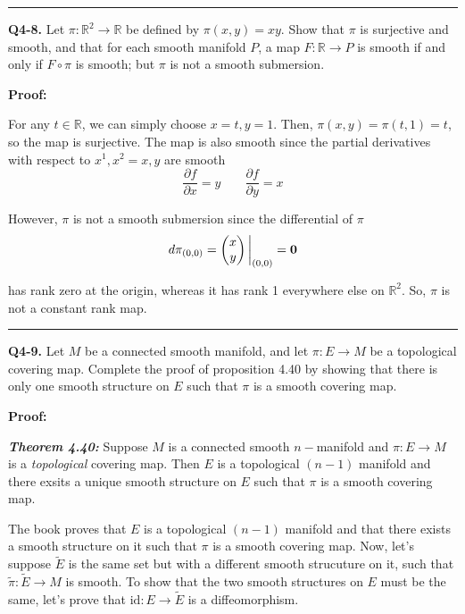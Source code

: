 \documentclass{article}
\newcommand{\R}{\mathbb{R}}
\newcommand{\restr}[2]{{%
  \left.\kern-\nulldelimiterspace %
  #1 %
  \vphantom{\big|} %
  \right|_{#2} %
  }}
\begin{document}
\vskip 0.5cm
\hrule 
\vskip 0.5cm


\textbf{Q4-8.} Let $\pi : \R^2 \rightarrow \R$ be defined by $\pi(x, y) = xy$. Show that $\pi$ is surjective and smooth, and that for each smooth manifold $P$, a map $F : \R \rightarrow P$ is smooth if and only if $F \circ \pi$ is smooth; but $\pi$ is not a smooth submersion.

\vskip 0.5cm
\textbf{Proof:}


For any $t \in \R$, we can simply choose $x = t, y = 1$. Then, $\pi(x, y) = \pi(t, 1) = t$, so the map is surjective. The map is also smooth since the partial derivatives with respect to $x^1, x^2 = x, y$ are smooth 
\[ \frac{\partial f}{\partial x} = y \;\;\;\;\;\;\; \frac{\partial f}{\partial y} = x \] 

However, $\pi$ is not a smooth submersion since the differential of $\pi$ 
\[ d\pi_{(0,0)} = \restr{\begin{pmatrix}
  x \\
  y
\end{pmatrix}}{(0,0)} = \mathbf{0} \]

has rank zero at the origin, whereas it has rank 1 everywhere else on $\R^2$. So, $\pi$ is not a constant rank map.

\vskip 0.5cm
\hrule 
\vskip 0.5cm




\textbf{Q4-9.} Let $M$ be a connected smooth manifold, and let $\pi : E \rightarrow M$ be a topological covering map. Complete the proof of proposition 4.40 by showing that there is only one smooth structure on $E$ such that $\pi$ is a smooth covering map.  

\vskip 0.5cm
\textbf{Proof:}

\begin{dottedbox}
  \emph{\textbf{Theorem 4.40:}} Suppose $M$ is a connected smooth $n-$manifold and $\pi : E \rightarrow M$ is a \emph{topological} covering map. Then $E$ is a topological $(n-1)$ manifold and there exsits a unique smooth structure on $E$ such that $\pi$ is a smooth covering map.
\end{dottedbox}

\vskip 0.5cm
The book proves that $E$ is a topological $(n-1)$ manifold and that there exists a smooth structure on it such that $\pi$ is a smooth covering map. Now, let's suppose $\tilde{E}$ is the same set but with a different smooth strucuture on it, such that $\tilde{\pi} : \tilde{E} \rightarrow M$ is smooth. To show that the two smooth structures on $E$ must be the same, let's prove that $\mathrm{id} : E \rightarrow \tilde{E}$ is a diffeomorphism.
\end{document}
